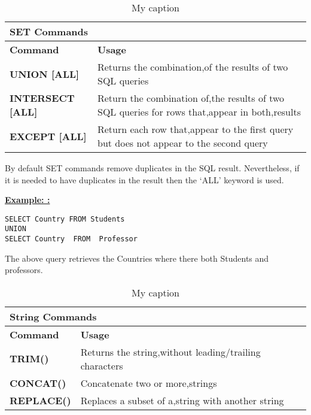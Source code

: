  
\begin{table}[h]
\centering
\caption{My caption}
\label{my-label}
\begin{tabular}{|l|l|}
\hline
\multicolumn{2}{|l|}{\textbf{SET Commands}}                                                                                                                                \\ \hline
\textbf{Command}                                    & \textbf{Usage}                                                                                                       \\ \hline
{\color[HTML]{333333} \textbf{UNION {[}ALL{]}}}     & {\color[HTML]{333333} Returns the combination,of the results of two SQL queries}                                     \\ \hline
{\color[HTML]{333333} \textbf{INTERSECT {[}ALL{]}}} & {\color[HTML]{333333} Return the combination of,the results of two SQL queries for rows that,appear in both,results} \\ \hline
{\color[HTML]{333333} \textbf{EXCEPT {[}ALL{]}}}    & {\color[HTML]{333333} Return each row that,appear to the first query but does not appear to the second query}        \\ \hline
\end{tabular}
\end{table}

By default SET commands remove duplicates in the SQL result. Nevertheless, if it is needed to have duplicates in the result then the ‘ALL’ keyword is used.  


\noindent\textbf{\underline{Example: :} } 
\begin{mdframed}[backgroundcolor=gray!20][h]
\begin{lstlisting}
SELECT Country FROM Students 
UNION
SELECT Country  FROM  Professor
\end{lstlisting}
\end{mdframed}

The above query retrieves the Countries where there both Students and professors. 

 
\begin{table}[]
\centering
\caption{My caption}
\label{my-label}
\begin{tabular}{|l|l|}
\hline
\multicolumn{2}{|l|}{\textbf{String Commands}}                                                                            \\ \hline
\textbf{Command}                          & \textbf{Usage}                                                                \\ \hline
{\color[HTML]{333333} \textbf{TRIM()}}    & {\color[HTML]{333333} Returns the string,without leading/trailing characters} \\ \hline
{\color[HTML]{333333} \textbf{CONCAT()}}  & {\color[HTML]{333333} Concatenate two or more,strings}                        \\ \hline
{\color[HTML]{333333} \textbf{REPLACE()}} & {\color[HTML]{333333} Replaces a subset of a,string with another string}      \\ \hline
\end{tabular}
\end{table}


